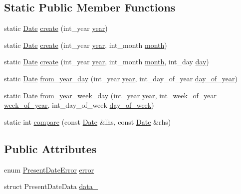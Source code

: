 \subsection*{\-Static \-Public \-Member \-Functions}
\begin{DoxyCompactItemize}
\item 
static \hyperlink{structDate}{\-Date} \hyperlink{structDate_af6a6aa2e75464311dc7eee91e25aee47}{create} (int\-\_\-year \hyperlink{structDate_aac4f4635d8db0ea1a32c2f979a1a6cc0}{year})
\item 
static \hyperlink{structDate}{\-Date} \hyperlink{structDate_a0b1280e69ec6310ec8cdfb730e8dd7f6}{create} (int\-\_\-year \hyperlink{structDate_aac4f4635d8db0ea1a32c2f979a1a6cc0}{year}, int\-\_\-month \hyperlink{structDate_a39f4a9fd570f306025f78447477e42d6}{month})
\item 
static \hyperlink{structDate}{\-Date} \hyperlink{structDate_ae0bcc2332237bf0f5b57ed646a00e6ac}{create} (int\-\_\-year \hyperlink{structDate_aac4f4635d8db0ea1a32c2f979a1a6cc0}{year}, int\-\_\-month \hyperlink{structDate_a39f4a9fd570f306025f78447477e42d6}{month}, int\-\_\-day \hyperlink{structDate_ac4993265144899a83ee57cd6d54d3bff}{day})
\item 
static \hyperlink{structDate}{\-Date} \hyperlink{structDate_af3a7ed97e385d134e39c42092d082405}{from\-\_\-year\-\_\-day} (int\-\_\-year \hyperlink{structDate_aac4f4635d8db0ea1a32c2f979a1a6cc0}{year}, int\-\_\-day\-\_\-of\-\_\-year \hyperlink{structDate_aa1aaeb37af12be4ac07337b5e4ba8206}{day\-\_\-of\-\_\-year})
\item 
static \hyperlink{structDate}{\-Date} \hyperlink{structDate_a88c032d0e05efa136df450f1d3564760}{from\-\_\-year\-\_\-week\-\_\-day} (int\-\_\-year \hyperlink{structDate_aac4f4635d8db0ea1a32c2f979a1a6cc0}{year}, int\-\_\-week\-\_\-of\-\_\-year \hyperlink{structDate_af051f922cdc105f86b92fc6d8bbdfa90}{week\-\_\-of\-\_\-year}, int\-\_\-day\-\_\-of\-\_\-week \hyperlink{structDate_ac85eed3a3b2d579cdc74b2af801740b0}{day\-\_\-of\-\_\-week})
\item 
static int \hyperlink{structDate_afc234509ba1c8b1717e52181e7ad256d}{compare} (const \hyperlink{structDate}{\-Date} \&lhs, const \hyperlink{structDate}{\-Date} \&rhs)
\end{DoxyCompactItemize}
\subsection*{\-Public \-Attributes}
\begin{DoxyCompactItemize}
\item 
enum \hyperlink{date_8h_a42798e6b91456e88f492437d3e826c0b}{\-Present\-Date\-Error} \hyperlink{structDate_adb2a42cb857f6462788b856b2f60cfb2}{error}
\item 
struct \-Present\-Date\-Data \hyperlink{structDate_a15a7ce699435bf3c9c60bfff5e1806de}{data\-\_\-}
\end{DoxyCompactItemize}
